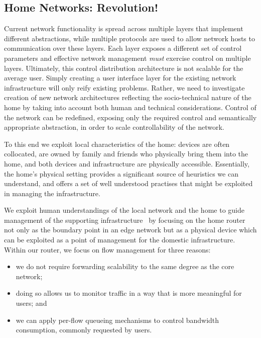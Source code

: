 \subsection{Home Networks: Revolution!} \label{s:revolution}

Current network functionality is spread across multiple layers that implement
different abstractions, while multiple protocols are used to allow network hosts
to communication over these layers. Each layer exposes a different set of
control parameters and effective network management \emph{must} exercise control
on multiple layers. Ultimately, this control distribution architecture is not
scalable for the average user. Simply creating a user interface layer for the
existing network infrastructure will only reify existing problems.  Rather, we
need to investigate creation of new network architectures reflecting the
socio-technical nature of the home by taking into account both human and
technical considerations. Control of the network can be redefined, exposing only
the required control and semantically appropriate abstraction, in order to scale
controllability of the network.  

To this end we exploit local characteristics of the home: devices are often
collocated, are owned by family and friends who physically bring them into the
home, and both devices and infrastructure are physically accessible.
Essentially, the home's physical setting provides a significant source of
heuristics we can understand, and offers a set of well understood practises that
might be exploited in managing the infrastructure.  

We exploit human understandings of the local network and the home to guide
management of the supporting
infrastructure~\cite{crabtree03} by focusing on the
home router not only as the boundary point in an edge network but as a physical
device which can be exploited as a point of management for the domestic
infrastructure.  Within our router, we focus on flow management for three
reasons: 

\begin{itemize}
    \item we do not require forwarding scalability to the same degree as the
          core network; 
    \item doing so allows us to monitor traffic in a way that is more meaningful
          for users; and 
    \item we can apply per-flow queueing mechanisms to control bandwidth
          consumption, commonly requested by users.  
  \end{itemize}

